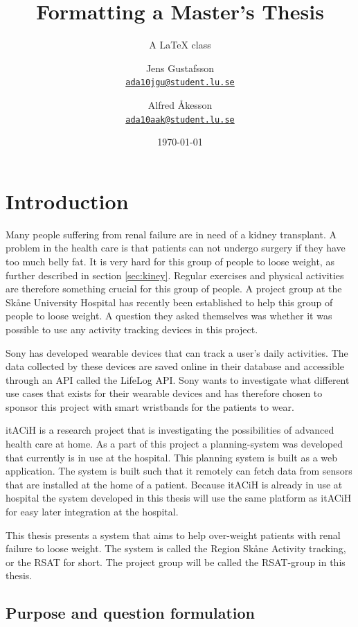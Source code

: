 \documentclass{cslthse-msc}
\author{
	Jens Gustafsson \\
	{\normalsize \href{mailto:ada10jgu@student.lu.se}{\texttt{ada10jgu@student.lu.se}}}
	\and
	Alfred Åkesson \\
    {\normalsize \href{mailto:ada10aak@student.lu.se}{\texttt{ada10aak@student.lu.se}}}
}
\title{Formatting a Master's Thesis}
\subtitle{A {\LaTeX} class}
\date{\today}
\begin{document}
\makefrontmatter


\chapter[Introduction]{Introduction}

Many people suffering from renal failure are in need of a kidney transplant. A problem in the health care is that patients can not undergo surgery if they have too much belly fat. It is very hard for this group of people to loose weight, as further described in section \ref{sec:kiney}. Regular exercises and physical activities are therefore something crucial for this group of people. A project group at the Skåne University Hospital has recently been established to help this group of people to loose weight. A question they asked themselves was whether it was possible to use any activity tracking devices in this project.

Sony has developed wearable devices that can track a user’s daily activities. The data collected by these devices are saved online in their database and accessible through an API called the LifeLog API. Sony wants to investigate what different use cases that exists for their wearable devices and has therefore chosen to sponsor this project with smart wristbands for the patients to wear.

itACiH is a research project that is investigating the possibilities of advanced health care at home. As a part of this project a planning-system was developed that currently is in use at the hospital. This planning system is built as a web application. The system is built such that it remotely can fetch data from sensors that are installed at the home of a patient. Because itACiH is already in use at hospital the system developed in this thesis will use the same platform as itACiH for easy later integration at the hospital. 

This thesis presents a system that aims to help over-weight patients with renal failure to loose weight. The system is called the Region Skåne Activity tracking, or the RSAT for short. The project group will be called the RSAT-group in this thesis.




\newpage

\section{Purpose and question formulation}
\end{document}
